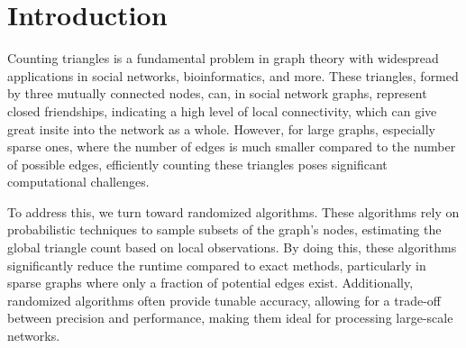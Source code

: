 \documentclass[12pt]{report}
\begin{document}
\section{Introduction}

Counting triangles is a fundamental problem in graph theory with widespread applications in social networks, bioinformatics, and more.
These triangles, formed by three mutually connected nodes, can, in social network graphs, represent closed friendships, indicating a high level of local connectivity, which can give great insite into the network as a whole.
However, for large graphs, especially sparse ones, where the number of edges is much smaller compared to the number of possible edges, efficiently counting these triangles poses significant computational challenges.

To address this, we turn toward randomized algorithms. These algorithms rely on probabilistic techniques to sample subsets of the graph's nodes, estimating the global triangle count based on local observations.
By doing this, these algorithms significantly reduce the runtime compared to exact methods, particularly in sparse graphs where only a fraction of potential edges exist.
Additionally, randomized algorithms often provide tunable accuracy, allowing for a trade-off between precision and performance, making them ideal for processing large-scale networks.




\cite{knuth1984texbook}


\newpage


\end{document}
